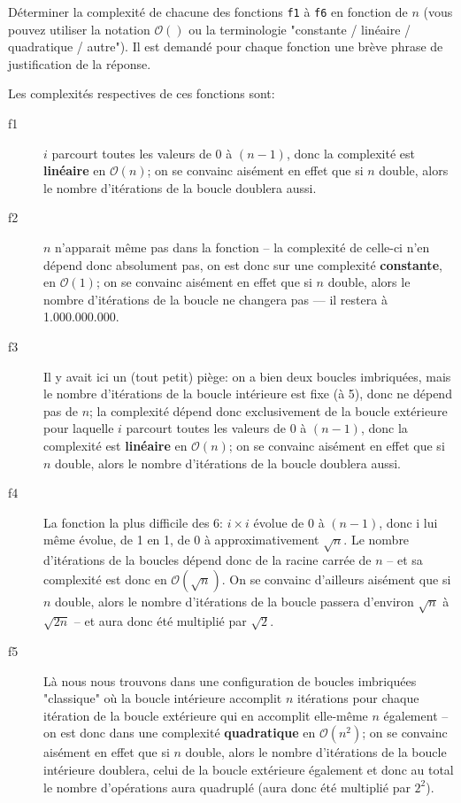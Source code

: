 \documentclass[11pt,a4paper]{exam}
\begin{document}
\begin{questions}
\begin{spacing}{1}
		Déterminer la complexité de chacune des fonctions \texttt{f1} à \texttt{f6} en fonction de $n$ (vous pouvez utiliser la notation $\mathcal{O}()$ ou la terminologie "constante / linéaire / quadratique / autre"). Il est demandé pour chaque fonction une brève phrase de justification de la réponse.
		
		\begin{solution}
			Les complexités respectives de ces fonctions sont:
			\begin{description}
				\item[f1] $i$ parcourt toutes les valeurs de $0$ à $(n-1)$, donc la complexité est \textbf{linéaire} en $\mathcal{O}(n)$; on se convainc aisément en effet que si $n$ double, alors le nombre d'itérations de la boucle doublera aussi.
				\item[f2] $n$ n'apparait même pas dans la fonction -- la complexité de celle-ci n'en dépend donc absolument pas, on est donc sur une complexité \textbf{constante}, en $\mathcal{O}(1)$; on se convainc aisément en effet que si $n$ double, alors le nombre d'itérations de la boucle ne changera pas --- il restera à 1.000.000.000.
				\item[f3] Il y avait ici un (tout petit) piège: on a bien deux boucles imbriquées, mais le nombre d'itérations de la boucle intérieure est fixe (à 5), donc ne dépend pas de $n$; la complexité dépend donc exclusivement de la boucle extérieure pour laquelle $i$ parcourt toutes les valeurs de $0$ à $(n-1)$, donc la complexité est \textbf{linéaire} en $\mathcal{O}(n)$; on se convainc aisément en effet que si $n$ double, alors le nombre d'itérations de la boucle doublera aussi.
				\item[f4] La fonction la plus difficile des 6: $i \times i$ évolue de $0$ à $(n-1)$, donc i lui même évolue, de 1 en 1, de $0$ à approximativement $\sqrt{n}$. Le nombre d'itérations de la boucles dépend donc de la racine carrée de $n$ -- et sa complexité est donc en $\mathcal{O}(\sqrt{n})$. On se convainc d'ailleurs aisément que si $n$ double, alors le nombre d'itérations de la boucle passera d'environ $\sqrt{n}$ à $\sqrt{2n}$ -- et aura donc été multiplié par $\sqrt{2}$.
				\item[f5] Là nous nous trouvons dans une configuration de boucles imbriquées "classique" où la boucle intérieure accomplit $n$ itérations pour chaque itération de la boucle extérieure qui en accomplit elle-même $n$ également -- on est donc dans une complexité \textbf{quadratique} en $\mathcal{O}(n^2)$; on se convainc aisément en effet que si $n$ double, alors le nombre d'itérations de la boucle intérieure doublera, celui de la boucle extérieure également et donc au total le nombre d'opérations aura quadruplé (aura donc été multiplié par $2^2$).

\end{description}
\end{solution}
\end{spacing}
\end{questions}
\end{document}
